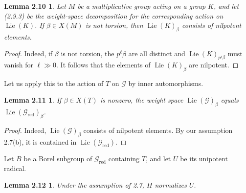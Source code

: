 \documentclass[11pt]{article}
\newcommand{\Lie}{\operatorname{Lie}}
\newcommand{\red}{\mathrm{red}}
\newtheorem*{lemma210}{Lemma 2.10}
\newtheorem*{lemma211}{Lemma 2.11}
\newtheorem*{lemma212}{Lemma 2.12}
\begin{document}
\begin{lemma210}
Let \(M\) be a multiplicative group acting on a group \(K\), and let (2.9.3) be the
weight-space decomposition for the corresponding action on \(\Lie(K)\). If
\(\beta\in X(M)\) is not torsion, then \(\Lie(K)_\beta\) consists of nilpotent elements.
\end{lemma210}

\begin{proof}
Indeed, if \(\beta\) is not torsion, the \(p^\ell\beta\) are all distinct and
\(\Lie(K)_{p^\ell\beta}\) must vanish for \(\ell\gg0\). It follows that the elements of
\(\Lie(K)_\beta\) are nilpotent.
\end{proof}

Let us apply this to the action of \(T\) on \(\mathcal G\) by inner automorphisms.

\begin{lemma211}
If \(\beta\in X(T)\) is nonzero, the weight space \(\Lie(\mathcal G)_\beta\) equals
\(\Lie(\mathcal G_{\red})_\beta\).
\end{lemma211}

\begin{proof}
Indeed, \(\Lie(\mathcal G)_\beta\) consists of nilpotent elements. By our assumption
2.7(b), it is contained in \(\Lie(\mathcal G_{\red})\).
\end{proof}

Let \(B\) be a Borel subgroup of \(\mathcal G_{\red}\) containing \(T\), and let \(U\)
be its unipotent radical.

\begin{lemma212}
Under the assumption of 2.7, \(H\) normalizes \(U\).
\end{lemma212}
\end{document}
